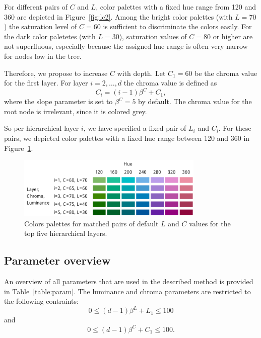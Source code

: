 \documentclass[journal]{vgtc}                %
\begin{document}
For different pairs of $C$ and $L$, color palettes with a fixed hue range from 120 and 360 are depicted in Figure~\ref{fig:lc2}. Among the bright color palettes (with $L=70$) the saturation level of $C=60$ is sufficient to discriminate the colors easily. For the dark color paletetes (with $L=30$), saturation values of $C=80$ or higher are not superfluous, especially because the assigned hue range is often very narrow for nodes low in the tree.

Therefore, we propose to increase $C$ with depth. Let $C_1=60$ be the chroma value for the first layer. For layer $i=2,\ldots, d$ the chroma value is defined as
\begin{equation}
C_i=(i-1)\beta^C + C_1,
\end{equation}
where the slope parameter is set to $\beta^C=5$ by default. The chroma value for the root node is irrelevant, since it is colored grey.

So per hierarchical layer $i$, we have specified a fixed pair of $L_i$ and $C_i$. For these pairs, we depicted color palettes with a fixed hue range between 120 and 360 in Figure~\ref{fig:lc3}.

\begin{figure}[tb]
  \centering
  \includegraphics[width=3.5in]{LC3.pdf}
  \caption{Colors palettes for matched pairs of default $L$ and $C$ values for the top five hierarchical layers.}\label{fig:lc3}
\end{figure}



\subsection{Parameter overview}

An overview of all parameters that are used in the described method is provided in Table~\ref{table:param}. The luminance and chroma parameters are restricted to the following contraints:
\begin{equation}
0 \leq (d-1)\beta^L + L_1 \leq 100
\end{equation}
and 
\begin{equation}
0 \leq (d-1)\beta^C + C_1 \leq 100.
\end{equation}
\end{document}

